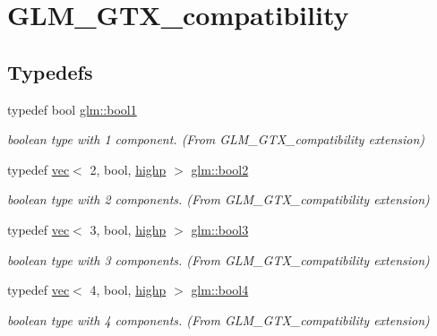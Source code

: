 \hypertarget{group__gtx__compatibility}{}\section{G\+L\+M\+\_\+\+G\+T\+X\+\_\+compatibility}
\label{group__gtx__compatibility}
\subsection*{Typedefs}
\begin{DoxyCompactItemize}
\item 
typedef bool \mbox{\hyperlink{group__gtx__compatibility_gab65f19f5170f95a2f06d6aa6482c9405}{glm\+::bool1}}
\begin{DoxyCompactList}\small\item\em boolean type with 1 component. (From G\+L\+M\+\_\+\+G\+T\+X\+\_\+compatibility extension) \end{DoxyCompactList}\item 
typedef \mbox{\hyperlink{structglm_1_1vec}{vec}}$<$ 2, bool, \mbox{\hyperlink{namespaceglm_a36ed105b07c7746804d7fdc7cc90ff25ac6f7eab42eacbb10d59a58e95e362074}{highp}} $>$ \mbox{\hyperlink{group__gtx__compatibility_ga19e8114c90e2c81cfa87db72f4020b52}{glm\+::bool2}}
\begin{DoxyCompactList}\small\item\em boolean type with 2 components. (From G\+L\+M\+\_\+\+G\+T\+X\+\_\+compatibility extension) \end{DoxyCompactList}\item 
typedef \mbox{\hyperlink{structglm_1_1vec}{vec}}$<$ 3, bool, \mbox{\hyperlink{namespaceglm_a36ed105b07c7746804d7fdc7cc90ff25ac6f7eab42eacbb10d59a58e95e362074}{highp}} $>$ \mbox{\hyperlink{group__gtx__compatibility_ga9d9411e411bc3bcb7ec64593f5e0908f}{glm\+::bool3}}
\begin{DoxyCompactList}\small\item\em boolean type with 3 components. (From G\+L\+M\+\_\+\+G\+T\+X\+\_\+compatibility extension) \end{DoxyCompactList}\item 
typedef \mbox{\hyperlink{structglm_1_1vec}{vec}}$<$ 4, bool, \mbox{\hyperlink{namespaceglm_a36ed105b07c7746804d7fdc7cc90ff25ac6f7eab42eacbb10d59a58e95e362074}{highp}} $>$ \mbox{\hyperlink{group__gtx__compatibility_ga16892e963e3aa2aa6c826a508d2df3ce}{glm\+::bool4}}
\begin{DoxyCompactList}\small\item\em boolean type with 4 components. (From G\+L\+M\+\_\+\+G\+T\+X\+\_\+compatibility extension) \end{DoxyCompactList}\item 

\end{DoxyCompactItemize}
